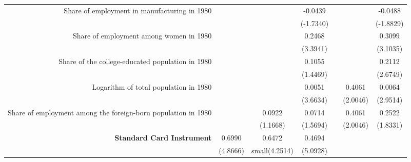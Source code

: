 \begin{frame}
\begin{table}[ht]
{\begin{tabular}{rcccccc}
                Share of employment in manufacturing in 1980                  &                 &                 & -0.0439         &                &                 & -0.0488         \\
                                                                              &                 &                 & \small(-1.7340) &                &                 & \small(-1.8829) \\
                Share of employment among women in 1980                       &                 &                 & 0.2468          &                &                 & 0.3099          \\
                                                                              &                 &                 & \small(3.3941)  &                &                 & \small(3.1035)  \\
                Share of the college-educated population in 1980              &                 &                 & 0.1055          &                &                 & 0.2112          \\
                                                                              &                 &                 & \small(1.4469)  &                &                 & \small(2.6749)  \\
                Logarithm of total population in 1980                         &                 &                 & 0.0051          &                & 0.4061          & 0.0064          \\
                                                                              &                 &                 & \small(3.6634)  &                & \small(2.0046)  & \small(2.9514)  \\
                Share of employment among the foreign-born population in 1980 &                 & 0.0922          & 0.0714          &                & 0.4061          & 0.2522          \\
                                                                              &                 & \small(1.1668)  & \small(1.5694)  &                & \small(2.0046)  & \small(1.8331)  \\
                \bf{Standard Card Instrument}                                 & 0.6990          & 0.6472          & 0.4694          &                &                 &                 \\
                                                                              & \small(4.8666)  & small(4.2514)   & \small(5.0928)  &                &                 &                 \\

\end{tabular}}
\end{table}
\end{frame}
